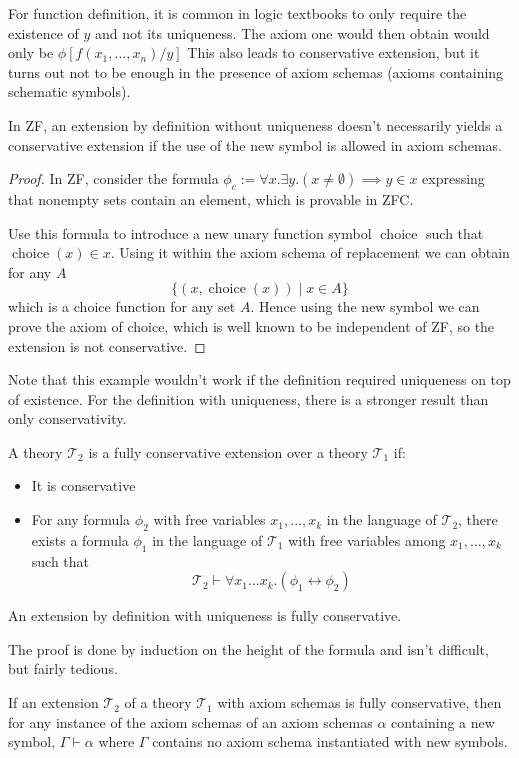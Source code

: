 For function definition, it is common in logic textbooks to only require the existence of $y$ and not its uniqueness. The axiom one would then obtain would only be $\phi[f(x_1,...,x_n)/y]$ This also leads to conservative extension, but it turns out not to be enough in the presence of axiom schemas (axioms containing schematic symbols).
\begin{lemma}
In ZF, an extension by definition without uniqueness doesn't necessarily yields a conservative extension if the use of the new symbol is allowed in axiom schemas.
\end{lemma}
\begin{proof}
In ZF, consider the formula $\phi_c := \forall x. \exists y. (x \neq \emptyset) \implies y \in x$ expressing that nonempty sets contain an element, which is provable in ZFC.

Use this formula to introduce a new unary function symbol $\operatorname{choice}$ such that $\operatorname{choice}(x) \in x$. Using it within the axiom schema of replacement we can obtain for any $A$
$$
\lbrace (x, \operatorname{choice}(x)) \mid x \in A \rbrace
$$
which is a choice function for any set $A$. Hence using the new symbol we can prove the axiom of choice, which is well known to be independent of ZF, so the extension is not conservative.
\end{proof}
Note that this example wouldn't work if the definition required uniqueness on top of existence.
For the definition with uniqueness, there is a stronger result than only conservativity.
\begin{defin}
A theory $\mathcal{T}_2$ is a fully conservative extension over a theory $\mathcal{T}_1$ if:
\begin{itemize}
\item It is conservative
\item For any formula $\phi_2$ with free variables $x_1, ..., x_k$ in the language of $\mathcal{T}_2$, there exists a formula $\phi_1$ in the language of $\mathcal{T}_1$ with free variables among $x_1, ..., x_k$ such that
$$\mathcal{T}_2 \vdash \forall x_1...x_k. (\phi_1 \leftrightarrow \phi_2)$$
\end{itemize}
\end{defin}
\begin{thm}
An extension by definition with uniqueness is fully conservative.
\end{thm}
The proof is done by induction on the height of the formula and isn't difficult, but fairly tedious.
\begin{thm}
If an extension $\mathcal{T}_2$ of a theory $\mathcal{T}_1$ with axiom schemas is fully conservative, then for any instance of the axiom schemas of an axiom schemas $\alpha$ containing a new symbol, $\Gamma \vdash \alpha$ where $\Gamma$ contains no axiom schema instantiated with new symbols.

\end{thm}
